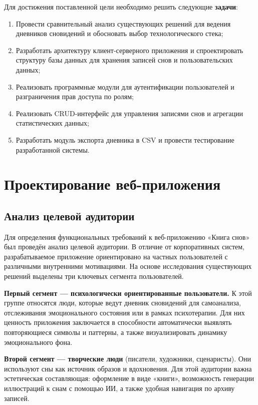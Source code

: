 \documentclass[14pt, a4paper]{extarticle}
\begin{document}
Для достижения поставленной цели необходимо решить следующие \textbf{задачи}:
\begin{enumerate}
	\item Провести сравнительный анализ существующих решений для ведения дневников сновидений и обосновать выбор технологического стека;
	\item Разработать архитектуру клиент-серверного приложения и спроектировать структуру базы данных для хранения записей снов и пользовательских данных;
	\item Реализовать программные модули для аутентификации пользователей и разграничения прав доступа по ролям;
	\item Реализовать CRUD-интерфейс для управления записями снов и агрегации статистических данных;
	\item Разработать модуль экспорта дневника в CSV и провести тестирование разработанной системы.
\end{enumerate}

\newpage


\section{Проектирование веб-приложения}

\subsection{Анализ целевой аудитории}

Для определения функциональных требований к веб-приложению «Книга снов» 
был проведён анализ целевой аудитории. В отличие от корпоративных систем, 
разрабатываемое приложение ориентировано на частных пользователей с 
различными внутренними мотивациями. На основе исследования существующих 
решений выделены три ключевых сегмента пользователей.

\textbf{Первый сегмент — психологически ориентированные пользователи.} 
К этой группе относятся люди, которые ведут дневник сновидений для 
самоанализа, отслеживания эмоционального состояния или в рамках 
психотерапии. Для них ценность приложения заключается в способности 
автоматически выявлять повторяющиеся символы и паттерны, а также 
визуализировать динамику эмоционального фона.

\textbf{Второй сегмент — творческие люди} (писатели, художники, 
сценаристы). Они используют сны как источник образов и вдохновения. 
Для этой аудитории важна эстетическая составляющая: оформление в виде 
«книги», возможность генерации иллюстраций к снам с помощью ИИ, а также 
удобная навигация по архиву записей.
\end{document}
